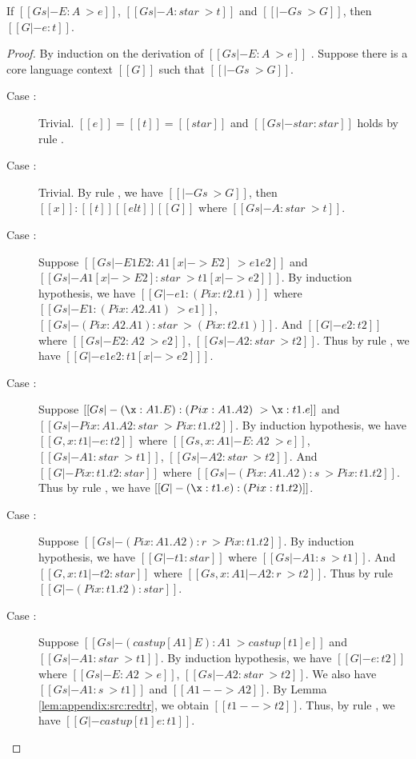 \begin{lem}
If $[[Gs |- E:A ~> e]]$, $[[Gs |- A:star ~> t]]$ and $[[|- Gs ~> G]]$, then $[[G |- e:t]]$.
\end{lem}

\begin{proof}
    By induction on the derivation of $[[Gs |- E : A ~> e]]$ . Suppose there is a core language context $[[G]]$ such that $[[|- Gs ~> G]]$.
    \begin{description}
        \item[Case :] Trivial. $[[e]] = [[t]] = [[star]]$ and $[[Gs |- star:star]]$ holds by rule .
        \item[Case :] Trivial. By rule , we have $[[|- Gs ~> G]]$, then $[[x]]:[[t]] [[elt]] [[G]]$ where $[[Gs |- A:star~>t]]$.
        \item[Case :] Suppose $[[Gs |- E1 E2 : A1[x |-> E2] ~> e1 e2]]$ and $[[Gs |- A1[x |-> E2] : star ~> t1 [x |-> e2] ]]$. By induction hypothesis, we have $[[G |- e1 : (Pi x:t2.t1)]]$ where $[[Gs |- E1 : (Pi x:A2.A1) ~> e1]]$, $[[Gs |- (Pi x:A2.A1) : star ~> (Pi x:t2.t1)]]$. And $[[G |- e2:t2]]$ where $[[Gs |- E2 : A2 ~> e2]]$, $[[Gs |- A2 : star ~> t2]]$. Thus by rule , we have $[[G |- e1 e2 : t1 [x |-> e2] ]]$.
        \item[Case :] Suppose $[[Gs |- (\x:A1.E):(Pi x:A1.A2) ~> \x:t1.e]]$ and $[[Gs |- Pi x:A1.A2 : star ~> Pi x:t1.t2]]$. By induction hypothesis, we have $[[G, x : t1 |- e:t2]]$ where $[[Gs, x : A1 |- E : A2 ~> e]]$, $[[Gs |- A1 : star ~> t1]]$, $[[Gs |- A2 : star ~> t2]]$. And $[[G |- Pi x:t1.t2 : star]]$ where $[[Gs |- (Pi x:A1.A2) : s ~> Pi x:t1.t2]]$. Thus by rule , we have $[[G |- (\x:t1.e):(Pi x:t1.t2)]]$.
        \item[Case :] Suppose $[[Gs |- (Pi x:A1.A2):r ~> Pi x:t1.t2]]$. By induction hypothesis, we have $[[G |- t1 : star]]$ where $[[Gs |- A1 : s ~> t1]]$. And $[[G, x : t1 |- t2 : star]]$ where $[[Gs, x: A1 |- A2 : r ~> t2]]$. Thus by rule  $[[G |- (Pi x:t1.t2) : star]]$.
        \item[Case :] Suppose $[[Gs |- (castup[A1] E):A1 ~> castup[t1] e]]$ and $[[Gs |- A1 : star ~> t1]]$. By induction hypothesis, we have $[[G |- e : t2]]$ where $[[Gs |- E : A2 ~> e]]$, $[[Gs |- A2 : star ~> t2]]$. We also have $[[Gs |- A1 : s ~> t1]]$ and $[[A1 --> A2]]$. By Lemma \ref{lem:appendix:src:redtr}, we obtain $[[t1 --> t2]]$. Thus, by rule , we have $[[G |- castup[t1] e : t1]]$.

\end{description}
\end{proof}

